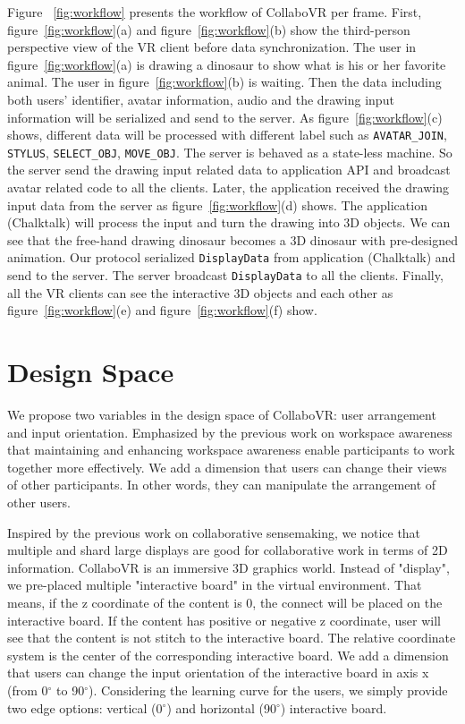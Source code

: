 \documentclass{sigchi}
\begin{document}

Figure ~\ref{fig:workflow} presents the workflow of CollaboVR per frame. First, figure~\ref{fig:workflow}(a) and figure~\ref{fig:workflow}(b) show the third-person perspective view of the VR client before data synchronization. The user in figure~\ref{fig:workflow}(a) is drawing a dinosaur to show what is his or her favorite animal. The user in figure~\ref{fig:workflow}(b) is waiting. Then the data including both users' identifier, avatar information, audio and the drawing input information will be serialized and send to the server. As figure~\ref{fig:workflow}(c) shows, different data will be processed with different label such as \verb|AVATAR_JOIN|, \verb|STYLUS|, \verb|SELECT_OBJ|, \verb|MOVE_OBJ|. The server is behaved as a state-less machine. So the server send the drawing input related data to application API and broadcast avatar related code to all the clients. Later, the application received the drawing input data from the server as figure~\ref{fig:workflow}(d) shows. The application (Chalktalk) will process the input and turn the drawing into 3D objects. We can see that the free-hand drawing dinosaur becomes a 3D dinosaur with pre-designed animation. Our protocol serialized \verb|DisplayData| from application (Chalktalk) and send to the server. The server broadcast \verb|DisplayData| to all the clients. Finally, all the VR clients can see the interactive 3D objects and each other as figure~\ref{fig:workflow}(e) and figure~\ref{fig:workflow}(f) show.

\section{Design Space}
We propose two variables in the design space of CollaboVR: user arrangement and input orientation. Emphasized by the previous work on workspace awareness that maintaining and enhancing workspace awareness enable participants to work together more effectively. We add a dimension that users can change their views of other participants. In other words, they can manipulate the arrangement of other users. 

Inspired by the previous work on collaborative sensemaking, we notice that multiple and shard large displays are good for collaborative work in terms of 2D information. CollaboVR is an immersive 3D graphics world. Instead of "display", we pre-placed multiple "interactive board" in the virtual environment. That means, if the z coordinate of the content is 0, the connect will be placed on the interactive board. If the content has positive or negative z coordinate, user will see that the content is not stitch to the interactive board. The relative coordinate system is the center of the corresponding interactive board. We add a dimension that users can change the input orientation of the interactive board in axis x (from 0$^{\circ}$ to 90$^{\circ}$). Considering the learning curve for the users, we simply provide two edge options: vertical (0$^{\circ}$) and horizontal (90$^{\circ}$) interactive board.
\end{document}

